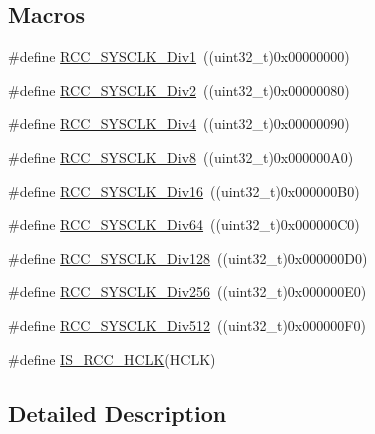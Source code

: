 \subsection*{Macros}
\begin{DoxyCompactItemize}
\item 
\#define \hyperlink{group___a_h_b__clock__source_gadc3ac37d90c2082d640e5948fac0878f}{R\+C\+C\+\_\+\+S\+Y\+S\+C\+L\+K\+\_\+\+Div1}~((uint32\+\_\+t)0x00000000)
\item 
\#define \hyperlink{group___a_h_b__clock__source_gacadd82156776154a07d128b454fc69fd}{R\+C\+C\+\_\+\+S\+Y\+S\+C\+L\+K\+\_\+\+Div2}~((uint32\+\_\+t)0x00000080)
\item 
\#define \hyperlink{group___a_h_b__clock__source_ga458f8ae63164e878930dbebd7643f087}{R\+C\+C\+\_\+\+S\+Y\+S\+C\+L\+K\+\_\+\+Div4}~((uint32\+\_\+t)0x00000090)
\item 
\#define \hyperlink{group___a_h_b__clock__source_gade72fe3aca89f3e8c4fe8692ea217912}{R\+C\+C\+\_\+\+S\+Y\+S\+C\+L\+K\+\_\+\+Div8}~((uint32\+\_\+t)0x000000\+A0)
\item 
\#define \hyperlink{group___a_h_b__clock__source_gaefd8df4be9c9dbd9cebfb2384933500a}{R\+C\+C\+\_\+\+S\+Y\+S\+C\+L\+K\+\_\+\+Div16}~((uint32\+\_\+t)0x000000\+B0)
\item 
\#define \hyperlink{group___a_h_b__clock__source_gab6a2c2d4e945c607259988a9b6df26e5}{R\+C\+C\+\_\+\+S\+Y\+S\+C\+L\+K\+\_\+\+Div64}~((uint32\+\_\+t)0x000000\+C0)
\item 
\#define \hyperlink{group___a_h_b__clock__source_ga1a28926fcb86112058a365e01fe9a46b}{R\+C\+C\+\_\+\+S\+Y\+S\+C\+L\+K\+\_\+\+Div128}~((uint32\+\_\+t)0x000000\+D0)
\item 
\#define \hyperlink{group___a_h_b__clock__source_gaa28bb876893b3267a813fc98a462d5ee}{R\+C\+C\+\_\+\+S\+Y\+S\+C\+L\+K\+\_\+\+Div256}~((uint32\+\_\+t)0x000000\+E0)
\item 
\#define \hyperlink{group___a_h_b__clock__source_gab5b4588c455d6327bc96f131ed6698ab}{R\+C\+C\+\_\+\+S\+Y\+S\+C\+L\+K\+\_\+\+Div512}~((uint32\+\_\+t)0x000000\+F0)
\item 
\#define \hyperlink{group___a_h_b__clock__source_ga6e9f1c193a2f41bcb3c2f7fa8459b5b3}{I\+S\+\_\+\+R\+C\+C\+\_\+\+H\+C\+LK}(H\+C\+LK)
\end{DoxyCompactItemize}


\subsection{Detailed Description}


